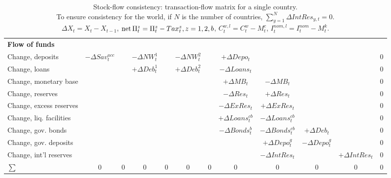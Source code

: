 \documentclass[a4paper,11pt]{article}
\begin{document}
\begin{appendices}
\begin{landscape}
\begin{table}
\begin{tabular}{l|c|c|c|c|c|c|c|c|c|c|c}
\hline
\textbf{Flow of funds}		&								&								&						&								&						&									&							&										&									&							& \\
Change, deposits			& $-\Delta Sav^{acc}_t$			&								& $-\Delta NW^1_t$		&								& $-\Delta NW^2_t$		&									& $+\Delta Depo_t$			&										&									&							& $0$ \\
Change, loans				&								&								& $+\Delta Deb^1_t$		&								& $+\Delta Deb^2_t$		&									& $-\Delta Loans_t$			&										&									&							& $0$ \\
Change, monetary base		&								&								&						&								&						& 									& $+\Delta MB_t$			& $-\Delta MB_t$						&									&							& $0$ \\
Change, reserves			&								&								&						&								&						&									& $-\Delta Res_t$			& $+\Delta Res_t$						&									&							& $0$ \\
Change, excess reserves		&								&								&						&								&						&									& $-\Delta ExRes_t$			& $+\Delta ExRes_t$						&									&							& $0$ \\
Change, liq. facilities		&								&								&						&								&						&									& $+\Delta Loans^{cb}_t$	& $-\Delta Loans^{cb}_t$				&									&							& $0$ \\
Change, gov. bonds			&								&								&						&								&						&									& $-\Delta Bonds^b_t$		& $-\Delta Bonds^{cb}_t$				& $+\Delta Deb_t$					&							& $0$ \\
Change, gov. deposits		&								&								&						&								&						&									&							& $+\Delta Depo^g_t$					& $-\Delta Depo^g_t$				&							& $0$ \\
Change, int'l reserves		&								&								&						&								&						&									&							& $-\Delta IntRes_t$					&									& $+\Delta IntRes_t$		& $0$ \\
\hline
$\sum$						& $0$							& $0$							& $0$					& $0$							& $0$					& $0$								& $0$						& $0$									& $0$								& $0$						& $0$ \\
\bottomrule
\end{tabular}%
\caption{Stock-flow consistency: transaction-flow matrix for a single country.\\
To ensure consistency for the world, if $N$ is the number of countries, \enspace $\sum_{y=1}^N \Delta IntRes_{y,t} = 0$.\\
$\Delta X_t = X_t - X_{t-1}$, \quad $\operatorname{net} \Pi^z_t = \Pi^z_t - Tax^z_t, z = 1, 2, b$, \quad $C_t^{w,l} = C_t^w - M^c_t$, \quad $I^{nom,l}_t = I^{nom}_t - M^k_t$.}
\label{tab:SFC2-0.2}
\end{table}
\end{landscape}


\end{appendices}
\end{document}
